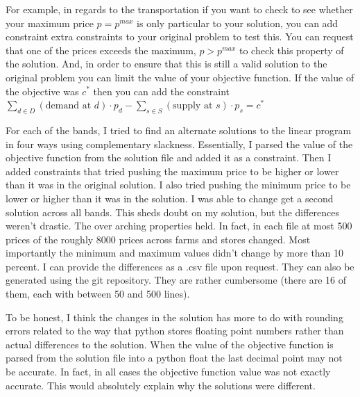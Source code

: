 \documentclass{report}
\begin{document}
For example, in regards to the transportation if you want to check to see whether your maximum price $p = p^{max}$ is only particular to your solution, you can add constraint extra constraints to your original problem to test this. You can request that one of the prices exceeds the maximum, $p > p^{max}$ to check this property of the solution. And, in order to ensure that this is still a valid solution to the original problem you can limit the value of your objective function. If the value of the objective was $c^*$ then you can add the constraint  $ \sum_{d \in D}  (\text{demand at } d) \cdot p_{d} -   \sum_{s \in S}  (\text{supply at } s) \cdot p_{s} = c^*$

For each of the bands, I tried to find an alternate solutions to the linear program in four ways using complementary slackness. Essentially, I parsed the value of the objective function from the solution file and added it as a constraint. Then I added constraints that tried pushing the maximum price to be higher or lower than it was in the original solution. I also tried pushing the minimum price to be lower or higher than it was in the solution. I was able to change get a second solution across all bands. This sheds doubt on my solution, but the differences weren't drastic. The over arching properties held. In fact, in each file at most 500 prices of the roughly 8000 prices across farms and stores changed. Most importantly the minimum and maximum values didn't change by more than 10 percent. I can provide the differences as a .csv file upon request. They can also be generated using the git repository. They are rather cumbersome (there are 16 of them, each with between 50 and 500 lines).

To be honest, I think the changes in the solution has more to do with rounding errors related to the way that python stores floating point numbers rather than actual differences to the solution. When the value of the objective function is parsed from the solution file into a python float the last decimal point may not be accurate. In fact, in all cases the objective function value was not exactly accurate. This would absolutely explain why the solutions were different.


\end{document}
